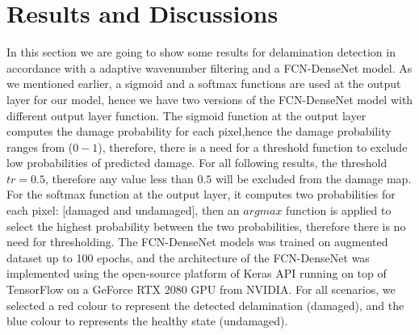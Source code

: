 \section{Results and Discussions}
	In this section we are going to show some results for delamination detection in accordance with a adaptive wavenumber filtering and a FCN-DenseNet model. 
	As we mentioned earlier, a sigmoid and a softmax functions are used at the output layer for our model, hence we have two versions of the FCN-DenseNet model with different output layer function.
	The sigmoid function at the output layer computes the damage probability for each pixel,hence the damage probability ranges from (\(0 - 1\)), therefore, there is a need for a threshold function to exclude low probabilities of predicted damage. 
	For all following results, the threshold \(tr = 0.5\), therefore any value less than \(0.5\) will be excluded from the damage map.
	For the softmax function at the output layer, it computes two probabilities for each pixel: [damaged and undamaged], then an \(argmax\) function is applied to select the highest probability between the two probabilities, therefore there is no need for thresholding. 
	The FCN-DenseNet models was trained on augmented dataset up to 100 epochs, and the architecture of the FCN-DenseNet  was implemented using the open-source platform of Keras API running on top of TensorFlow on a GeForce RTX 2080  GPU from NVIDIA.
	For all scenarios, we selected a red colour to represent the detected delamination (damaged), and the blue colour to represents the healthy state (undamaged).
	
